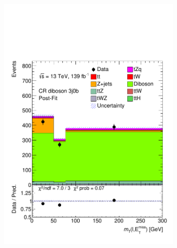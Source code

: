 \begin{figure}[!h]
\begin{subfigure}[b]{0.33\linewidth}
    \includegraphics[width=\textwidth]{ubonn-thesis/Chapters/Chapters_07/Figure/Data/CR_3j0b_postFit.pdf} 
    \caption{}
  \end{subfigure}%
  \newline
  \centering
  \begin{subfigure}[b]{0.33\linewidth}

\end{subfigure}
\end{figure}
